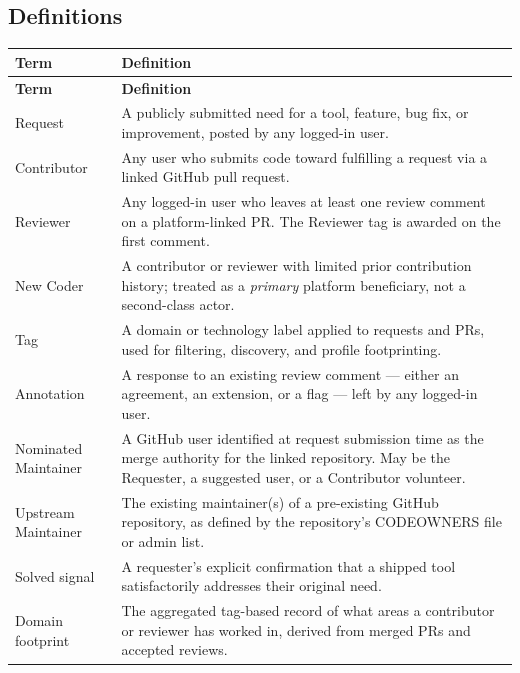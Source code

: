 \documentclass[12pt,a4paper]{article}
\begin{document}
\subsection{Definitions}
\begin{longtable}{L{3.2cm} L{10.5cm}}
  \color{white}\bfseries Term & \color{white}\bfseries Definition \\
  \endfirsthead
  \color{white}\bfseries Term & \color{white}\bfseries Definition \\
  \endhead\hline
  Request          & A publicly submitted need for a tool, feature, bug fix, or improvement, posted by any logged-in user. \\
  Contributor      & Any user who submits code toward fulfilling a request via a linked GitHub pull request. \\
  Reviewer         & Any logged-in user who leaves at least one review comment on a platform-linked PR. The Reviewer tag is awarded on the first comment. \\
  New Coder        & A contributor or reviewer with limited prior contribution history; treated as a \emph{primary} platform beneficiary, not a second-class actor. \\
  Tag              & A domain or technology label applied to requests and PRs, used for filtering, discovery, and profile footprinting. \\
  Annotation       & A response to an existing review comment --- either an agreement, an extension, or a flag --- left by any logged-in user. \\
  Nominated Maintainer & A GitHub user identified at request submission time as the merge authority for the linked repository. May be the Requester, a suggested user, or a Contributor volunteer. \\
  Upstream Maintainer & The existing maintainer(s) of a pre-existing GitHub repository, as defined by the repository's CODEOWNERS file or admin list. \\
  Solved signal    & A requester's explicit confirmation that a shipped tool satisfactorily addresses their original need. \\
  Domain footprint & The aggregated tag-based record of what areas a contributor or reviewer has worked in, derived from merged PRs and accepted reviews. \\
  \hline
\end{longtable}
\end{document}
